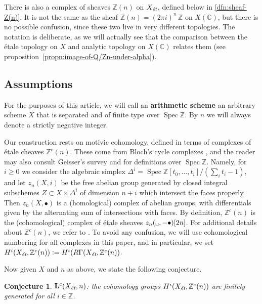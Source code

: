 \documentclass[leqno,12pt]{article}
\theoremstyle{plain}
\newtheorem{conjecture}[theorem]{\indent\sc Conjecture}
\theoremstyle{definition}
\DeclareMathOperator{\Spec}{Spec}
\newcommand{\ZZ}{\mathbb{Z}}
\newcommand{\CC}{\mathbb{C}}
\newcommand{\dfn}{\mathrel{\mathop:}=}
\newcommand{\et}{\text{\it \'{e}t}}
\begin{document}
There is also a complex of sheaves $\ZZ (n)$ on $X_\et$, defined below in
\ref{dfn:sheaf-Z(n)}. It is not the same as the sheaf
$\ZZ (n) = (2\pi i)^n\,\ZZ$ on $X (\CC)$, but there is no possible confusion,
since these two live in very different topologies. The notation is deliberate,
as we will actually see that the comparison between the \'{e}tale topology on $X$
and analytic topology on $X (\CC)$ relates them
(see proposition~\ref{propn:image-of-Q/Zn-under-alpha}).

\subsection*{Assumptions}

For the purposes of this article, we will call an \textbf{arithmetic scheme} an
arbitrary scheme $X$ that is separated and of finite type over $\Spec \ZZ$.
By $n$ we will always denote a strictly negative integer.

Our construction rests on motivic cohomology, defined in terms of complexes
of \'{e}tale cheaves $\ZZ^c (n)$. These come from Bloch's cycle complexes
\cite{Bloch-1986}, and the reader may also consult Geisser's survey
\cite{Geisser-2005} and \cite{Geisser-2004-Dedekind} for definitions over
$\Spec \ZZ$. Namely, for $i \ge 0$ we consider the algebraic simplex
$\Delta^i = \Spec \ZZ[t_0,\ldots,t_i]/(\sum_i t_i - 1)$, and let $z_n (X,i)$ be
the free abelian group generated by closed integral subschemes
$Z \subset X \times \Delta^i$ of dimension $n + i$ which intersect the faces
properly. Then $z_n (X, \bullet)$ is a (homological) complex of abelian groups,
with differentials given by the alternating sum of intersections with faces.
By definition, $\ZZ^c (n)$ is the (cohomological) complex of \'{e}tale sheaves
$z_n (\text{\textvisiblespace}, -\bullet) [2n]$. For additional details about
$\ZZ^c (n)$, we refer to \cite[\S 2]{Geisser-2010}. To avoid any confusion,
we will use cohomological numbering for all complexes in this paper, and in
particular, we set $H^i (X_\et, \ZZ^c(n)) \dfn H^i (R\Gamma (X_\et, \ZZ^c(n))$.

\vspace{1em}

Now given $X$ and $n$ as above, we state the following conjecture.

\begin{conjecture}
  $\mathbf{L}^c (X_\et,n)$: the cohomology groups $H^i (X_\et, \ZZ^c (n))$ are
  finitely generated for all $i \in \ZZ$.
\end{conjecture}
\end{document}
